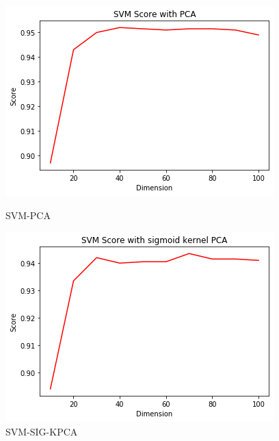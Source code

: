 \documentclass[12pt]{article}
\begin{document}
\begin{figure}[htb]
	\centering
	\begin{minipage}{.3\textwidth}
		\centering
		\includegraphics[width=\linewidth]{./exp-figs/SVM-PCA.png}
		\caption{SVM-PCA}
		\label{fig:SVM-PCA}
	\end{minipage}%
	\begin{minipage}{0.3\textwidth}
		\centering
		\includegraphics[width=\linewidth]{./exp-figs/SVM-SIG-KPCA.png}
		\caption{SVM-SIG-KPCA}
		\label{fig:SVM-SIG-KPCA}
	\end{minipage}
	\begin{minipage}{0.3\textwidth}
		\centering

\end{minipage}
\end{figure}
\end{document}
